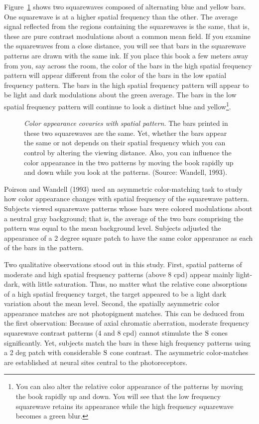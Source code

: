 Figure~\ref{f8:squarewave} shows two squarewaves composed of
alternating blue and yellow bars.  One squarewave is at a higher
spatial frequency than the other.  The average signal reflected from
the regions containing the squarewaves is the same, that is, these are
pure contrast modulations about a common mean field.  If you examine
the squarewaves from a close distance, you will see that bars in the
squarewave patterns are drawn with the same ink.  If you place this
book a few meters away from you, say across the room, the color of the
bars in the high spatial frequency pattern will appear different from
the color of the bars in the low spatial frequency pattern.  The bars
in the high spatial frequency pattern will appear to be light and dark
modulations about the green average.  The bars in the low spatial
frequency pattern will continue to look a distinct blue and
yellow\footnote{You can also alter the relative color appearance of
the patterns by moving the book rapidly up and down.  You will see
that the low frequency squarewave retains its appearance while the
high frequency squarewave becomes a green blur.}.
\begin{figure}
\centerline{
}
\caption[Squarewave Color illusion]{
{\em Color appearance covaries with spatial pattern.}  The bars
printed in these two squarewaves are the same.  Yet, whether the bars
appear the same or not depends on their spatial frequency which you
can control by altering the viewing distance.  Also, you can influence
the color appearance in the two patterns by moving the book rapidly up
and down while you look at the patterns.  (Source: Wandell, 1993).  }
\label{f8:squarewave}
\end{figure}

Poirson and Wandell (1993) used an asymmetric color-matching task to
study how color appearance changes with spatial frequency of the
squarewave pattern.  Subjects viewed squarewave patterns whose bars
were colored modulations about a neutral gray background; that is, the
average of the two bars comprising the pattern was equal to the mean
background level.  Subjects adjusted the appearance of a 2 degree
square patch to have the same color appearance as each of the bars in
the pattern.

Two qualitative observations stood out in this study.  First, spatial
patterns of moderate and high spatial frequency patterns (above 8 cpd)
appear mainly light-dark, with little saturation.  Thus, no matter
what the relative cone absorptions of a high spatial frequency target,
the target appeared to be a light dark variation about the mean level.
Second, the spatially asymmetric color appearance matches are not
photopigment matches.  This can be deduced from the first observation:
Because of axial chromatic aberration, moderate frequency squarewave
contrast patterns (4 and 8 cpd) cannot stimulate the $\mbox{S}$ cones
significantly.  Yet, subjects match the bars in these high frequency
patterns using a 2 deg patch with considerable $\mbox{S}$ cone contrast.
The asymmetric color-matches are established at neural sites central
to the photoreceptors.

